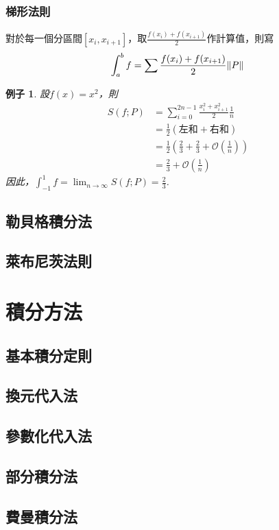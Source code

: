 \documentclass[12pt]{article}
\newtheorem*{example}{例子}
\begin{document}
    \subsubsection*{梯形法則}
    對於每一個分區間$[x_i,x_{i+1}]$，取$\frac{f(x_i)+f(x_{i+1})}{2}$作計算值，則寫$$\int_a^b f=\sum \frac{f(x_i)+f(x_{i+1})}{2}\norm*{P}$$

    \begin{example}
        設$f(x)=x^2$，則\begin{align*}
            S(f;P)&=\sum_{i=0}^{2n-1} \frac{x_i^2+x_{i+1}^2}{2} \frac{1}{n}\\
            &=\frac{1}{2}(\textrm{左和}+\textrm{右和})\\
            &=\frac{1}{2}(\frac{2}{3}+\frac{2}{3}+\mathcal{O}(\frac{1}{n}))\\
            &=\frac{2}{3}+\mathcal{O}(\frac{1}{n})
        \end{align*}
        因此，$\displaystyle\int_{-1}^1 f = \lim_{n\to \infty}S(f;P)=\frac{2}{3}$.
    \end{example}
    \subsection*{勒貝格積分法}
    \subsection*{萊布尼茨法則}
    \section*{積分方法}
    \subsection*{基本積分定則}
    \subsection*{換元代入法}
    \subsection*{參數化代入法}
    \subsection*{部分積分法}
    \subsection*{費曼積分法}
\end{document}
